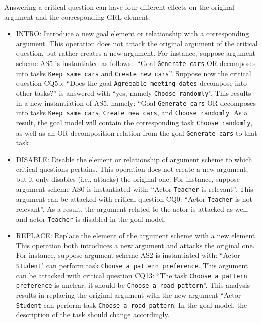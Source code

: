 Answering a critical question can have four different effects on the original argument and the corresponding GRL element:
\begin{itemize} 
\item \textsf{INTRO}: Introduce a new goal element or relationship with a corresponding argument. This operation does not attack the original argument of the critical question, but rather creates a new argument. For instance, suppose argument scheme AS5 is instantiated as follows:: ``Goal \texttt{Generate cars} OR-decomposes into tasks \texttt{Keep same cars} and \texttt{Create new cars}''. %
Suppose now the critical question CQ5b: ``Does the goal \texttt{Agreeable meeting dates} decompose into other tasks?'' is answered with ``yes, namely \texttt{Choose randomly}''. %
This results in a new instantiation of AS5, namely: ``Goal \texttt{Generate cars} OR-decomposes into tasks \texttt{Keep same cars}, \texttt{Create new cars}, and \texttt{Choose randomly}. As a result, the goal model will contain the corresponding task \texttt{Choose randomly}, as well as an OR-decomposition relation from the goal \texttt{Generate cars} to that task. %
\item \textsf{DISABLE:} Disable the element or relationship of argument scheme to which critical questions pertains. This operation does not create a new argument, but it only disables (i.e., attacks) the original one. For instance, suppose argument scheme AS0 is instantiated with: ``Actor \texttt{Teacher} is relevant''. This argument can be attacked with critical question CQ0: ``Actor \texttt{Teacher} is not relevant''. As a result, the argument related to the actor is attacked as well, and actor \texttt{Teacher} is disabled in the goal model.
\item \textsf{REPLACE:} Replace the element of the argument scheme with a new element. This operation both introduces a new argument and attacks the original one. For instance, suppose argument scheme AS2 is instantiated with: ``Actor \texttt{Student}" can perform task \texttt{Choose a pattern preference}. This argument can be attacked with critical question CQ13: ``The task \texttt{Choose a pattern preference} is unclear, it should be \texttt{Choose a road pattern}''. This analysis results in replacing the original argument with the new argument ``Actor \texttt{Student} can perform task \texttt{Choose a road pattern}. In the goal model, the description of the task should change accordingly.

\end{itemize}
